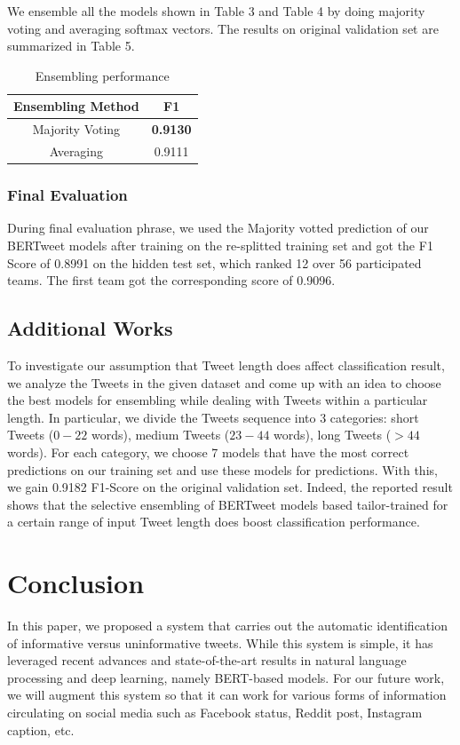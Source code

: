 \documentclass[11pt,a4paper]{article}
\begin{document}
We ensemble all the models shown in Table 3 and Table 4 by doing majority voting and averaging softmax vectors. The results on original validation set are summarized in Table 5.

\begin{table}[ht]
    \centering
    \begin{tabular}{|c|c|}
        \hline
        \bf{Ensembling Method} & \bf{F1} \\\hline
        Majority Voting & \textbf{0.9130} \\\hline
        Averaging & 0.9111 \\\hline
    \end{tabular}
    \caption{Ensembling performance}
    \label{tab:my_label}
\end{table}
\subsubsection{Final Evaluation}
During final evaluation phrase, we used the Majority votted prediction of our BERTweet models after training on the re-splitted training set and got the F1 Score of 0.8991 on the hidden test set, which ranked 12 over 56 participated teams. The first team got the corresponding score of 0.9096.

\subsection{Additional Works}
To investigate our assumption that Tweet length does affect classification result, we analyze the Tweets in the given dataset and come up with an idea to choose the best models for ensembling while dealing with Tweets within a particular length. In particular, we divide the Tweets sequence into 3 categories: short Tweets ($0 - 22$ words), medium Tweets ($23 - 44$ words), long Tweets ($> 44$ words). For each category, we choose 7 models that have the most correct predictions on our training set and use these models for predictions. With this, we gain 0.9182 F1-Score on the original validation set. Indeed, the reported result shows that the selective ensembling of BERTweet models based tailor-trained for a certain range of input Tweet length does boost classification performance. 

\section{Conclusion}

In this paper, we proposed a system that carries out the automatic identification of informative versus uninformative tweets. While this system is simple, it has leveraged recent advances and state-of-the-art results in natural language processing and deep learning, namely BERT-based models. For our future work, we will augment this system so that it can work for various forms of information circulating on social media such as Facebook status, Reddit post, Instagram caption, etc.



\end{document}

